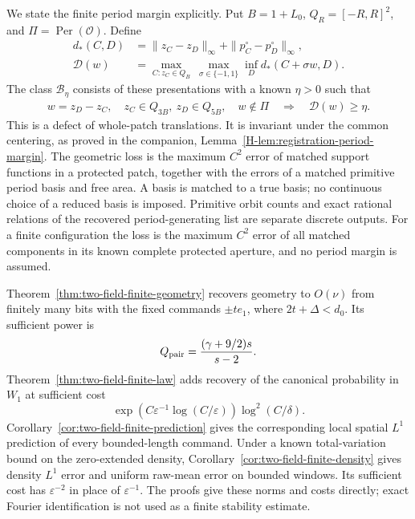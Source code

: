 We state the finite period margin explicitly. Put $B=1+L_0$,
$Q_R=[-R,R]^2$, and $\Pi=\operatorname{Per}(\mathcal O)$. Define
\begin{align}
 d_*(C,D)&=\|z_C-z_D\|_\infty+
                         \|p_C^\circ-p_D^\circ\|_\infty,\nonumber\\
 \mathcal D(w)&=\max_{C:z_C\in Q_B}\ \max_{\sigma\in\{-1,1\}}
                            \inf_D d_*(C+\sigma w,D).
                   \label{eq:two-field-patch-defect}
\end{align}
The class $\mathcal B_\eta$ consists of these presentations with a
known $\eta>0$ such that
\begin{equation}\label{eq:two-field-patch-margin}
 \begin{gathered}
 w=z_D-z_C,\quad z_C\in Q_{3B},\ z_D\in Q_{5B},\quad w\notin\Pi
                 \quad\Longrightarrow\quad\mathcal D(w)\ge\eta.
 \end{gathered}
\end{equation}
This is a defect of whole-patch translations. It is invariant under
the common centering, as proved in the companion,
Lemma~\ref{H-lem:registration-period-margin}. The geometric loss is
the maximum $C^2$ error of matched support functions in a protected
patch, together with the errors of a matched primitive period basis
and free area. A basis is matched to a true basis; no continuous
choice of a reduced basis is imposed. Primitive orbit counts and
exact rational relations of the recovered period-generating list are
separate discrete outputs. For a finite configuration the loss is
the maximum $C^2$ error of all matched components in its known
complete protected aperture, and no period margin is assumed.

Theorem~\ref{thm:two-field-finite-geometry} recovers geometry to
$O(\nu)$ from finitely many bits with the fixed commands $\pm te_1$,
where $2t+\Delta<d_0$. Its sufficient power is
\[
            Q_{\rm pair}=\frac{(\gamma+9/2)s}{s-2}.
\]
Theorem~\ref{thm:two-field-finite-law} adds recovery of the canonical
probability in $W_1$ at sufficient cost
\[
 \exp(C\varepsilon^{-1}\log(C/\varepsilon))\log^2(C/\delta).
\]
Corollary~\ref{cor:two-field-finite-prediction} gives the corresponding
local spatial $L^1$ prediction of every bounded-length command.
Under a known total-variation bound on the zero-extended density,
Corollary~\ref{cor:two-field-finite-density} gives density $L^1$ error
and uniform raw-mean error on bounded windows. Its sufficient cost
has $\varepsilon^{-2}$ in place of $\varepsilon^{-1}$. The proofs
give these norms and costs directly; exact Fourier identification is
not used as a finite stability estimate.

